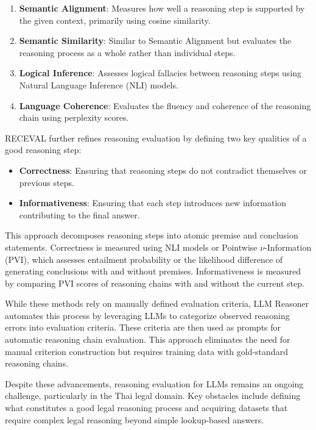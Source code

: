\begin{enumerate}
    \item \textbf{Semantic Alignment}: Measures how well a reasoning step is supported by the given context, primarily using cosine similarity.
    \item \textbf{Semantic Similarity}: Similar to Semantic Alignment but evaluates the reasoning process as a whole rather than individual steps.
    \item \textbf{Logical Inference}: Assesses logical fallacies between reasoning steps using Natural Language Inference (NLI) models.
    \item \textbf{Language Coherence}: Evaluates the fluency and coherence of the reasoning chain using perplexity scores.
\end{enumerate}

RECEVAL \cite{receval} further refines reasoning evaluation by defining two key qualities of a good reasoning step: 

\begin{itemize}
    \item \textbf{Correctness}: Ensuring that reasoning steps do not contradict themselves or previous steps.
    \item \textbf{Informativeness}: Ensuring that each step introduces new information contributing to the final answer.
\end{itemize}

This approach decomposes reasoning steps into atomic premise and conclusion statements. 
%
Correctness is measured using NLI models or Pointwise $\nu$-Information (PVI), which assesses entailment probability or the likelihood difference of generating conclusions with and without premises. 
%
Informativeness is measured by comparing PVI scores of reasoning chains with and without the current step.

While these methods rely on manually defined evaluation criteria, LLM Reasoner \cite{llmreasoners} automates this process by leveraging LLMs to categorize observed reasoning errors into evaluation criteria. 
%
These criteria are then used as prompts for automatic reasoning chain evaluation. 
%
This approach eliminates the need for manual criterion construction but requires training data with gold-standard reasoning chains.

Despite these advancements, reasoning evaluation for LLMs remains an ongoing challenge, particularly in the Thai legal domain. 
%
Key obstacles include defining what constitutes a good legal reasoning process and acquiring datasets that require complex legal reasoning beyond simple lookup-based answers.


